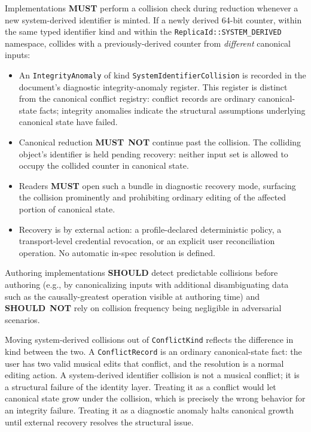 \documentclass[11pt,letterpaper]{report}
\newcounter{requirement}[chapter]
\newcommand{\MUST}{\textbf{MUST}}
\newcommand{\MUSTNOT}{\textbf{MUST}\nobreak\ \textbf{NOT}}
\newcommand{\SHOULD}{\textbf{SHOULD}}
\newcommand{\SHOULDNOT}{\textbf{SHOULD}\nobreak\ \textbf{NOT}}
\begin{document}
\begin{requirement}
  \label{req:graph:system-id-collision}
  Implementations \MUST{} perform a collision check during
  reduction whenever a new system-derived identifier is minted.
  If a newly derived 64-bit counter, within the same typed
  identifier kind and within the
  \texttt{ReplicaId::SYSTEM\_DERIVED} namespace, collides with a
  previously-derived counter from \emph{different} canonical
  inputs:

  \begin{itemize}
    \item An \texttt{IntegrityAnomaly} of kind
      \texttt{SystemIdentifierCollision} is recorded in the
      document's diagnostic integrity-anomaly register. This
      register is distinct from the canonical conflict registry:
      conflict records are ordinary canonical-state facts;
      integrity anomalies indicate the structural assumptions
      underlying canonical state have failed.
    \item Canonical reduction \MUSTNOT{} continue past the
      collision. The colliding object's identifier is held
      pending recovery: neither input set is allowed to occupy
      the collided counter in canonical state.
    \item Readers \MUST{} open such a bundle in diagnostic
      recovery mode, surfacing the collision prominently and
      prohibiting ordinary editing of the affected portion of
      canonical state.
    \item Recovery is by external action: a profile-declared
      deterministic policy, a transport-level credential
      revocation, or an explicit user reconciliation operation.
      No automatic in-spec resolution is defined.
  \end{itemize}

  Authoring implementations \SHOULD{} detect predictable
  collisions before authoring (e.g., by canonicalizing inputs
  with additional disambiguating data such as the
  causally-greatest operation visible at authoring time) and
  \SHOULDNOT{} rely on collision frequency being negligible in
  adversarial scenarios.
\end{requirement}

\begin{rationale}
  Moving system-derived collisions out of \texttt{ConflictKind}
  reflects the difference in kind between the two. A
  \texttt{ConflictRecord} is an ordinary canonical-state fact:
  the user has two valid musical edits that conflict, and the
  resolution is a normal editing action. A system-derived
  identifier collision is not a musical conflict; it is a
  structural failure of the identity layer. Treating it as a
  conflict would let canonical state grow under the collision,
  which is precisely the wrong behavior for an integrity
  failure. Treating it as a diagnostic anomaly halts canonical
  growth until external recovery resolves the structural issue.
\end{rationale}
\end{document}
